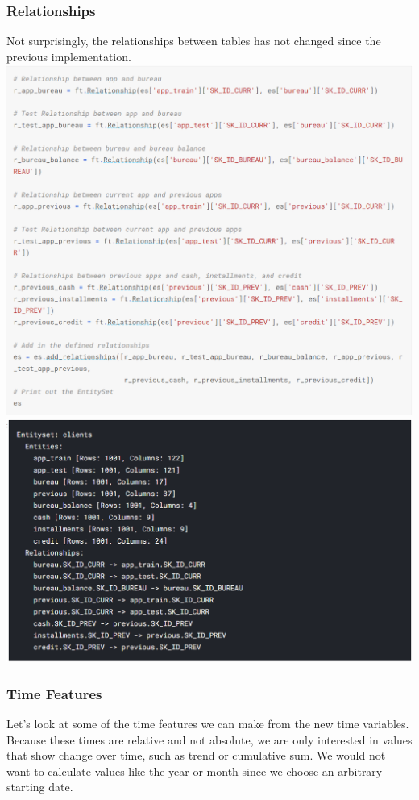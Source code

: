 \documentclass[twoside,a4paper]{article}
\begin{document}
\subsubsection{Relationships}
Not surprisingly, the relationships between tables has not changed since the previous implementation.\\
\includegraphics[scale=.7]{17.png}\\
\includegraphics[scale=.7]{18.png}
\subsubsection{Time Features}
Let's look at some of the time features we can make from the new time variables. Because these times are relative and not absolute, we are only interested in values that show change over time, such as trend or cumulative sum. We would not want to calculate values like the year or month since we choose an arbitrary starting date.
\end{document}
